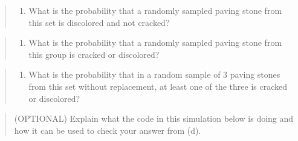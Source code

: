 \documentclass[
]{article}
\providecommand{\tightlist}{%
  \setlength{\itemsep}{0pt}\setlength{\parskip}{0pt}}
\begin{document}
\begin{quote}
\begin{enumerate}
\def\labelenumi{\alph{enumi}.}
\setcounter{enumi}{1}
\tightlist
\item
  What is the probability that a randomly sampled paving stone from this
  set is discolored and not cracked?
\end{enumerate}
\end{quote}

\vspace{.5cm}

\begin{quote}
\begin{enumerate}
\def\labelenumi{\alph{enumi}.}
\setcounter{enumi}{2}
\tightlist
\item
  What is the probability that a randomly sampled paving stone from this
  group is cracked or discolored?
\end{enumerate}
\end{quote}

\vspace{.5cm}

\begin{quote}
\begin{enumerate}
\def\labelenumi{\alph{enumi}.}
\setcounter{enumi}{3}
\tightlist
\item
  What is the probability that in a random sample of 3 paving stones
  from this set without replacement, at least one of the three is
  cracked or discolored?
\end{enumerate}
\end{quote}

\vspace{.5cm}

\begin{quote}
(OPTIONAL) Explain what the code in this simulation below is doing and
how it can be used to check your answer from (d).
\end{quote}
\end{document}
